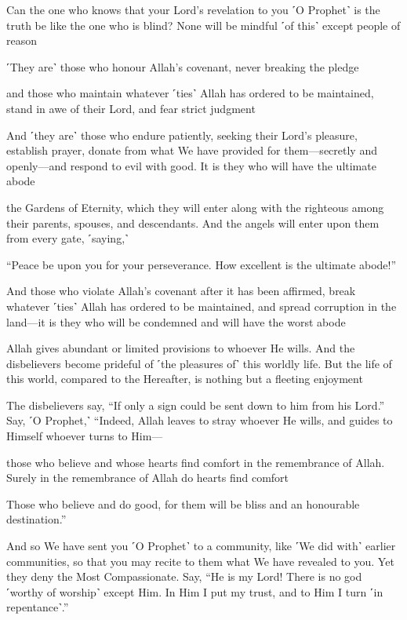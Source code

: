 Can the one who knows that your Lord’s revelation to you ˹O Prophet˺ is the truth be like the one who is blind? None will be mindful ˹of this˺ except people of reason

˹They are˺ those who honour Allah’s covenant, never breaking the pledge

and those who maintain whatever ˹ties˺ Allah has ordered to be maintained, stand in awe of their Lord, and fear strict judgment

And ˹they are˺ those who endure patiently, seeking their Lord’s pleasure, establish prayer, donate from what We have provided for them—secretly and openly—and respond to evil with good. It is they who will have the ultimate abode

the Gardens of Eternity, which they will enter along with the righteous among their parents, spouses, and descendants. And the angels will enter upon them from every gate, ˹saying,˺

“Peace be upon you for your perseverance. How excellent is the ultimate abode!”

And those who violate Allah’s covenant after it has been affirmed, break whatever ˹ties˺ Allah has ordered to be maintained, and spread corruption in the land—it is they who will be condemned and will have the worst abode

Allah gives abundant or limited provisions to whoever He wills. And the disbelievers become prideful of ˹the pleasures of˺ this worldly life. But the life of this world, compared to the Hereafter, is nothing but a fleeting enjoyment

The disbelievers say, “If only a sign could be sent down to him from his Lord.” Say, ˹O Prophet,˺ “Indeed, Allah leaves to stray whoever He wills, and guides to Himself whoever turns to Him—

those who believe and whose hearts find comfort in the remembrance of Allah. Surely in the remembrance of Allah do hearts find comfort

Those who believe and do good, for them will be bliss and an honourable destination.”

And so We have sent you ˹O Prophet˺ to a community, like ˹We did with˺ earlier communities, so that you may recite to them what We have revealed to you. Yet they deny the Most Compassionate. Say, “He is my Lord! There is no god ˹worthy of worship˺ except Him. In Him I put my trust, and to Him I turn ˹in repentance˺.”

